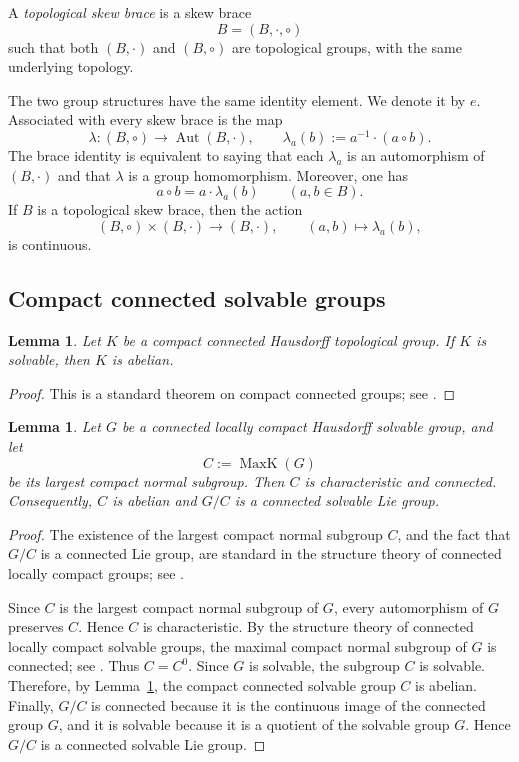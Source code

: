 \documentclass[reqno]{amsart}
\numberwithin{equation}{section}
\newtheorem{lemma}[theorem]{Lemma}
\theoremstyle{definition}
\theoremstyle{remark}
\DeclareMathOperator{\Aut}{Aut}
\DeclareMathOperator{\MaxK}{MaxK}
\begin{document}
A \emph{topological skew brace} is a skew brace
\[
B=(B,\cdot,\circ)
\]
such that both $(B,\cdot)$ and $(B,\circ)$ are
topological groups, with the same underlying topology.

The two group structures have the same identity element. We denote it by $e$.
Associated with every skew brace is the map
\[
\lambda\colon (B,\circ)\longrightarrow \Aut(B,\cdot),
\qquad
\lambda_a(b):=a^{-1}\cdot(a\circ b).
\]
The brace identity is equivalent to saying that each $\lambda_a$ is an
automorphism of $(B,\cdot)$ and that $\lambda$ is a group homomorphism. Moreover,
one has
\[
a\circ b=a\cdot \lambda_a(b)
\qquad (a,b\in B).
\]
If $B$ is a topological skew brace, then the action
\[
(B,\circ)\times (B,\cdot)\longrightarrow (B,\cdot),
\qquad
(a,b)\longmapsto \lambda_a(b),
\]
is continuous.

\subsection{Compact connected solvable groups}

\begin{lemma}\label{lem:compact-connected-solvable-abelian}
Let $K$ be a compact connected Hausdorff topological group. If $K$ is solvable,
then $K$ is abelian.
\end{lemma}

\begin{proof}
This is a standard theorem on compact connected groups; see
\cite[Theorem~9.33]{MorrisCompactGroups}.
\end{proof}

\begin{lemma}\label{lem:max-compact-connected-solvable}
Let $G$ be a connected locally compact Hausdorff solvable group, and let
\[
C:=\MaxK(G)
\]
be its largest compact normal subgroup. Then $C$ is characteristic and
connected. Consequently, $C$ is abelian and $G/C$ is a connected solvable Lie
group.
\end{lemma}

\begin{proof}
The existence of the largest compact normal subgroup \(C\), and the fact that
\(G/C\) is a connected Lie group, are standard in the structure theory of
connected locally compact groups; see
\cite[Theorem~8.36]{HofmannMorrisProLie}.

Since \(C\) is the largest compact normal subgroup of \(G\), every automorphism
of \(G\) preserves \(C\). Hence \(C\) is characteristic.
By the structure theory of connected locally compact solvable groups, the
maximal compact normal subgroup of \(G\) is connected; see
\cite[Theorem~8.37]{HofmannMorrisProLie}. Thus
$C=C^0$.
Since \(G\) is solvable, the subgroup \(C\) is solvable. Therefore, by
Lemma~\ref{lem:compact-connected-solvable-abelian}, the compact connected
solvable group \(C\) is abelian.
Finally, \(G/C\) is connected because it is the continuous image of the
connected group \(G\), and it is solvable because it is a quotient of the
solvable group \(G\). Hence \(G/C\) is a connected solvable Lie group.
\end{proof}
\end{document}
